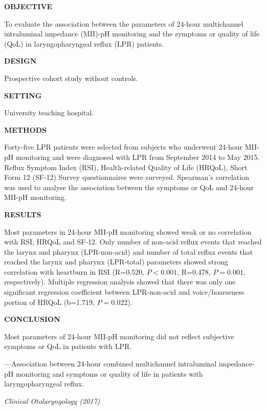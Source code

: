 \documentclass{ctexbook}
\begin{document}
\begin{sample}[label={myautocounter}]{\heiti}
  \textbf{OBJECTIVE} 
  
  To evaluate the association between the parameters of 24-hour multichannel intraluminal impedance (MII)-pH monitoring and the symptoms or quality of life (QoL) in laryngopharyngeal reflux (LPR) patients.

  \textbf{DESIGN} 
  
  Prospective cohort study without controls.

  \textbf{SETTING} 
  
  University teaching hospital.

  \textbf{METHODS} 
  
  Forty-five LPR patients were selected from subjects who underwent 24-hour MII-pH monitoring and were diagnosed with LPR from September 2014 to May 2015. Reflux Symptom Index (RSI), Health-related Quality of Life (HRQoL), Short Form 12 (SF-12) Survey questionnaires were surveyed. Spearman's correlation was used to analyse the association between the symptoms or QoL and 24-hour MII-pH monitoring.

  \textbf{RESULTS}

  Most parameters in 24-hour MII-pH monitoring showed weak or no correlation with RSI, HRQoL and SF-12. Only number of non-acid reflux events that reached the larynx and pharynx (LPR-non-acid) and number of total reflux events that reached the larynx and pharynx (LPR-total) parameters showed strong correlation with heartburn in RSI (R=0.520, $P<0.001$, R=0.478, $P=0.001$, respectively). Multiple regression analysis showed that there was only one significant regression coefficient between LPR-non-acid and voice/hoarseness portion of HRQoL (b=1.719, $P=0.022$).

  \textbf{CONCLUSION} 

  Most parameters of 24-hour MII-pH monitoring did not reflect subjective symptoms or QoL in patients with LPR.

  \begin{flushright}
    ---Association between 24-hour combined multichannel intraluminal impedance-pH monitoring and symptoms or quality of life in patients with laryngopharyngeal reflux. 
    
    \emph{Clinical Otolaryngology (2017)}
  \end{flushright}

  
\end{sample}
\end{document}
